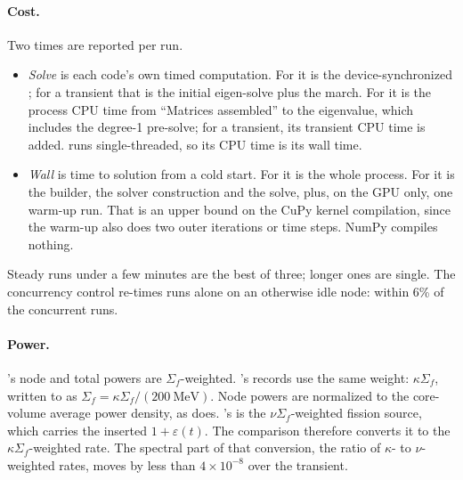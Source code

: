 \paragraph{Cost.} Two times are reported per run.
\begin{itemize}
\item \emph{Solve} is each code's own timed computation. For \garnet{} it is
  the device-synchronized ; for a transient that is the
  initial eigen-solve plus the march. For \ffn{} it is the process CPU time
  from ``Matrices assembled'' to the eigenvalue, which includes the degree-1
   pre-solve; for a transient, its transient CPU time is added.
  \ffn{} runs single-threaded, so its CPU time is its wall time.
\item \emph{Wall} is time to solution from a cold start. For \ffn{} it is the
  whole process. For \garnet{} it is the builder, the solver construction and
  the solve, plus, on the GPU only, one warm-up run. That is an upper bound
  on the CuPy kernel compilation, since the warm-up also does two outer
  iterations or time steps. NumPy compiles nothing.
\end{itemize}
Steady runs under a few minutes are the best of three; longer ones are single.
The concurrency control re-times runs alone on an otherwise idle node: within
6\% of the concurrent runs.

\paragraph{Power.} \ffn's node and total powers are $\Sigma_f$-weighted.
\garnet's records use the same weight: $\kappa\Sigma_f$, written to \ffn{} as
$\Sigma_f = \kappa\Sigma_f / (200~\mathrm{MeV})$. Node powers are normalized
to the core-volume average power density, as \ffn{} does. \garnet's
 is the $\nu\Sigma_f$-weighted fission source,
which carries the inserted $1+\varepsilon(t)$. The comparison therefore
converts it to the $\kappa\Sigma_f$-weighted rate. The spectral part of that
conversion, the ratio of $\kappa$- to $\nu$-weighted rates, moves by less than
$4 \times 10^{-8}$ over the transient.
